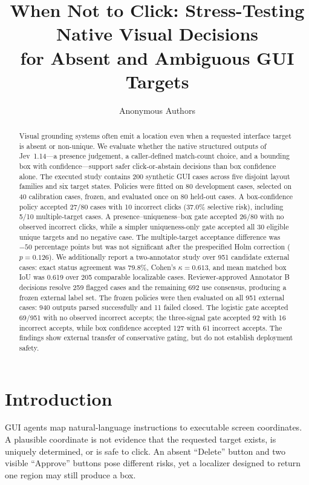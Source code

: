 \documentclass[10pt,twocolumn]{article}
\title{\textbf{When Not to Click: Stress-Testing Native Visual Decisions\\for Absent and Ambiguous GUI Targets}}
\author{Anonymous Authors}
\date{}
\newcommand{\jev}{Jev~1.14}
\begin{document}
\maketitle

\begin{abstract}
Visual grounding systems often emit a location even when a requested interface target is absent or non-unique. We evaluate whether the native structured outputs of \jev---a presence judgement, a caller-defined match-count choice, and a bounding box with confidence---support safer click-or-abstain decisions than box confidence alone. The executed study contains 200 synthetic GUI cases across five disjoint layout families and six target states. Policies were fitted on 80 development cases, selected on 40 calibration cases, frozen, and evaluated once on 80 held-out cases. A box-confidence policy accepted 27/80 cases with 10 incorrect clicks (37.0\% selective risk), including 5/10 multiple-target cases. A presence--uniqueness--box gate accepted 26/80 with no observed incorrect clicks, while a simpler uniqueness-only gate accepted all 30 eligible unique targets and no negative case. The multiple-target acceptance difference was $-50$ percentage points but was not significant after the prespecified Holm correction ($p=0.126$). We additionally report a two-annotator study over 951 candidate external cases: exact status agreement was 79.8\%, Cohen's $\kappa=0.613$, and mean matched box IoU was 0.619 over 205 comparable localizable cases. Reviewer-approved Annotator B decisions resolve 259 flagged cases and the remaining 692 use consensus, producing a frozen external label set. The frozen policies were then evaluated on all 951 external cases: 940 outputs parsed successfully and 11 failed closed. The logistic gate accepted 69/951 with no observed incorrect accepts; the three-signal gate accepted 92 with 16 incorrect accepts, while box confidence accepted 127 with 61 incorrect accepts. The findings show external transfer of conservative gating, but do not establish deployment safety.
\end{abstract}

\section{Introduction}
GUI agents map natural-language instructions to executable screen coordinates. A plausible coordinate is not evidence that the requested target exists, is uniquely determined, or is safe to click. An absent ``Delete'' button and two visible ``Approve'' buttons pose different risks, yet a localizer designed to return one region may still produce a box.
\end{document}
